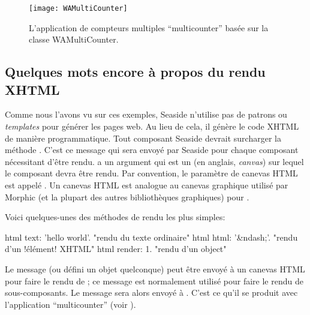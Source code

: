 \documentclass[a4paper,10pt,twoside]{book}
\begin{document}
\begin{figure}[bht]
\begin{center}
\texttt{[image: WAMultiCounter]}
\caption{L'application de compteurs multiples ``multicounter'' basée
  sur la classe WAMultiCounter.}
\end{center}
\end{figure}

\subsection{Quelques mots encore à propos du rendu XHTML}

Comme nous l'avons vu sur ces exemples, Seaside n'utilise pas de
patrons ou \emph{templates} pour générer les pages web.
Au lieu de cela, il génère le code XHTML de manière programmatique.
Tout composant Seaside devrait surcharger la méthode
 . C'est ce message qui sera
 envoyé par Seaside pour chaque composant nécessitant d'être rendu.
  a un argument qui est un
  
 (en anglais, \emph{canvas}) 
sur lequel le composant devra être rendu.
Par convention, le paramètre de canevas HTML est appelé 
 .
Un canevas HTML est analogue au canevas graphique utilisé par Morphic
(et la plupart des autres bibliothèques graphiques) pour
.
 
Voici quelques-unes des méthodes de rendu les plus simples:
\begin{code}{}
html text: 'hello world'.  "rendu du texte ordinaire"
html html: '&ndash;'.     "rendu d'un !élément! XHTML"
html render: 1.              "rendu d'un object"
\end{code}

Le message  
(ou  défini un objet quelconque)
peut être envoyé à un canevas HTML pour faire le rendu de ; 
ce message est normalement utilisé pour faire le rendu de sous-composants.
Le message  sera alors envoyé à .
C'est ce qu'il se produit avec l'application ``multicounter''
 (voir ).
\end{document}
